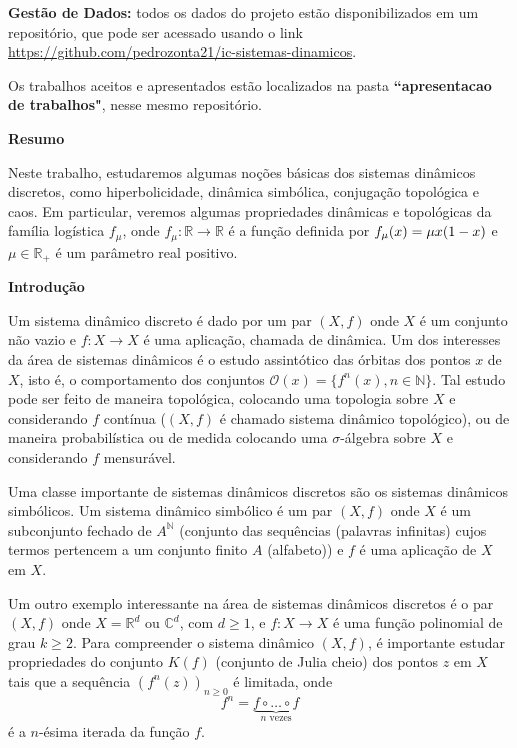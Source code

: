 \documentclass[12pt]{report}
\begin{document}
	\noindent\textbf{Gestão de Dados:} todos os dados do projeto estão disponibilizados em um repositório, que pode ser acessado usando o link \url{https://github.com/pedrozonta21/ic-sistemas-dinamicos}. 
	
	\noindent Os trabalhos aceitos e apresentados estão localizados na pasta \textbf{``apresentacao de trabalhos"}, nesse mesmo repositório.
	
	\newpage
	\tableofcontents
	
	\newpage
	{\LARGE\textbf{Resumo}}
	
	Neste trabalho, estudaremos algumas noções básicas dos sistemas dinâmicos discretos, como hiperbolicidade, dinâmica simbólica, conjugação topológica e caos. Em particular, veremos algumas propriedades dinâmicas e topológicas da família logística $f_\mu$, onde $f_\mu:\mathbb{R}\to\mathbb{R}$ é a função definida por $f_\mu(x)=\mu\/x(1-x)$ e $\mu \in \mathbb{R_+}$ é um parâmetro real positivo.
	
	\newpage
	{\LARGE\textbf{Introdução}}
	
	Um sistema dinâmico discreto é dado por um par $(X, f)$ onde $X$ é um conjunto não vazio e $f \colon X \to X$ é uma aplicação, chamada de dinâmica. Um dos interesses da área de sistemas dinâmicos é o estudo assintótico das órbitas dos pontos $x$ de $X$, isto é, o comportamento dos conjuntos $\mathcal{O}(x) = \{f^n(x), n \in \mathbb{N}\}$. Tal estudo pode ser feito de maneira topológica, colocando uma topologia sobre $X$ e considerando $f$ contínua ($(X, f)$ é chamado sistema dinâmico topológico), ou de maneira probabilística ou de medida colocando uma $\sigma$-álgebra sobre $X$ e considerando $f$ mensurável.
	
	Uma classe importante de sistemas dinâmicos discretos são os sistemas dinâmicos simbólicos. Um sistema dinâmico simbólico é um par $(X, f)$ onde $X$ é um subconjunto fechado de $A^{\mathbb{N}}$ (conjunto das sequências (palavras infinitas) cujos termos pertencem a um conjunto finito $A$ (alfabeto)) e $f$ é uma aplicação de $X$ em $X$.
	
	Um outro exemplo interessante na área de sistemas dinâmicos discretos é o par $(X, f)$ onde $X = \mathbb{R}^d$ ou $\mathbb{C}^d$, com $d \ge 1$, e $f \colon X \to X$ é uma função polinomial de grau $k \ge 2$. Para compreender o sistema dinâmico $(X, f)$, é importante estudar propriedades do conjunto $K(f)$ (conjunto de Julia cheio) dos pontos $z$ em $X$ tais que a sequência $(f^n(z))_{n \ge 0}$ é limitada, onde
	\[
	f^n = \underbrace{f \circ \dots \circ f}_{n \text{ vezes}}
	\]
	é a $n$-ésima iterada da função $f$.
	
\end{document}

